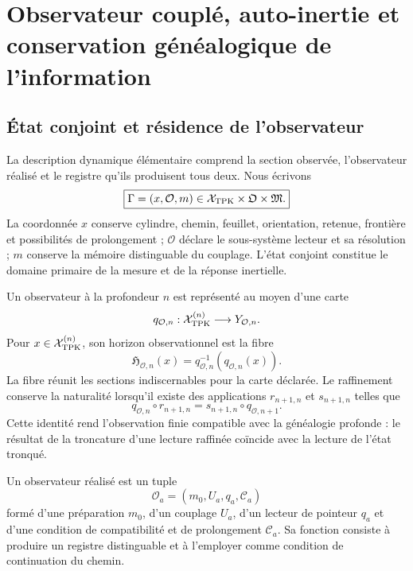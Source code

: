 \chapter{Observateur couplé, auto-inertie et conservation généalogique de l'information}
\label{chap:observador-autoinercia-landauer}

\section{État conjoint et résidence de l'observateur}

La description dynamique élémentaire comprend la section observée,
l'observateur réalisé et le registre qu'ils produisent tous deux. Nous écrivons
\begin{equation}
 \boxed{\Gamma=(x,\mathcal O,m)\in
 \mathcal X_{\rm TPK}\times\mathfrak O\times\mathfrak M.}
 \label{eq:rm-obs-joint-state}
\end{equation}
La coordonnée \(x\) conserve cylindre, chemin, feuillet, orientation, retenue,
frontière et possibilités de prolongement ; \(\mathcal O\) déclare le
sous-système lecteur et sa résolution ; \(m\) conserve la mémoire distinguable
du couplage. L'état conjoint constitue le domaine primaire de la
mesure et de la réponse inertielle.

Un observateur à la profondeur \(n\) est représenté au moyen d'une carte
\begin{equation}
 q_{\mathcal O,n}:\mathcal X_{\rm TPK}^{(n)}
 \longrightarrow Y_{\mathcal O,n}.
 \label{eq:rm-obs-observer-chart}
\end{equation}
Pour \(x\in\mathcal X_{\rm TPK}^{(n)}\), son horizon observationnel est la
fibre
\begin{equation}
 \mathfrak H_{\mathcal O,n}(x)
 =q_{\mathcal O,n}^{-1}(q_{\mathcal O,n}(x)).
 \label{eq:rm-obs-horizon-fiber}
\end{equation}
La fibre réunit les sections indiscernables pour la carte déclarée. Le
raffinement conserve la naturalité lorsqu'il existe des applications
\(r_{n+1,n}\) et \(s_{n+1,n}\) telles que
\begin{equation}
 q_{\mathcal O,n}\circ r_{n+1,n}
 =s_{n+1,n}\circ q_{\mathcal O,n+1}.
 \label{eq:rm-obs-observer-naturality}
\end{equation}
Cette identité rend l'observation finie compatible avec la généalogie
profonde : le résultat de la troncature d'une lecture raffinée coïncide avec la
lecture de l'état tronqué.

\begin{definition}
Un observateur réalisé est un tuple
\begin{equation}
 \mathcal O_a=(m_0,U_a,q_a,\mathcal C_a)
 \label{eq:rm-obs-realized-observer}
\end{equation}
formé d'une préparation \(m_0\), d'un couplage \(U_a\), d'un lecteur
de pointeur \(q_a\) et d'une condition de compatibilité et de prolongement
\(\mathcal C_a\). Sa fonction consiste à produire un registre distinguable
et à l'employer comme condition de continuation du chemin.
\end{definition}

